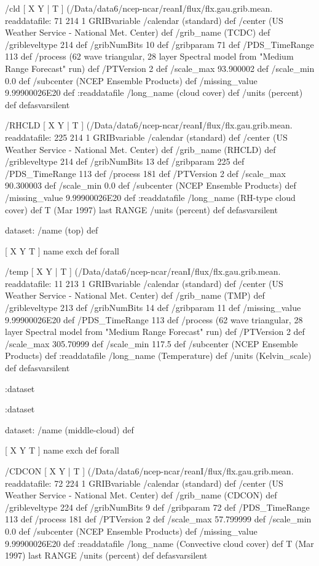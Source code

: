 \begin{ingrid}
  /cld { [ X Y | T ] (/Data/data6/ncep-ncar/reanI/flux/flx.gau.grib.mean.%
  readdatafile:
  71 214 1 GRIBvariable
  /calendar (standard) def
  /center (US Weather Service - National Met. Center) def
  /grib_name (TCDC) def
  /gribleveltype 214 def
  /gribNumBits 10 def
  /gribparam 71 def
  /PDS_TimeRange 113 def
  /process (62 wave triangular, 28 layer Spectral model from "Medium Range Forecast" run) def
  /PTVersion 2 def
  /scale_max 93.900002 def
  /scale_min 0.0 def
  /subcenter (NCEP Ensemble Products) def
  /missing_value 9.99900026E20 def
  :readdatafile
  /long_name (cloud cover) def
  /units (percent) def
  } defasvarsilent

  /RHCLD { [ X Y | T ] (/Data/data6/ncep-ncar/reanI/flux/flx.gau.grib.mean.%
  readdatafile:
  225 214 1 GRIBvariable
  /calendar (standard) def
  /center (US Weather Service - National Met. Center) def
  /grib_name (RHCLD) def
  /gribleveltype 214 def
  /gribNumBits 13 def
  /gribparam 225 def
  /PDS_TimeRange 113 def
  /process 181 def
  /PTVersion 2 def
  /scale_max 90.300003 def
  /scale_min 0.0 def
  /subcenter (NCEP Ensemble Products) def
  /missing_value 9.99900026E20 def
  :readdatafile
  /long_name (RH-type cloud cover) def
  T (Mar 1997) last RANGE
  /units (percent) def
  } defasvarsilent

  dataset: /name (top) def

   [ X Y T ] { name exch def } forall

   /temp { [ X Y | T ] (/Data/data6/ncep-ncar/reanI/flux/flx.gau.grib.mean.%
   readdatafile:
   11 213 1 GRIBvariable
   /calendar (standard) def
   /center (US Weather Service - National Met. Center) def
   /grib_name (TMP) def
   /gribleveltype 213 def
   /gribNumBits 14 def
   /gribparam 11 def
   /missing_value 9.99900026E20 def
   /PDS_TimeRange 113 def
   /process (62 wave triangular, 28 layer Spectral model from "Medium Range Forecast" run) def
   /PTVersion 2 def
   /scale_max 305.70999 def
   /scale_min 117.5 def
   /subcenter (NCEP Ensemble Products) def
   :readdatafile
   /long_name (Temperature) def
   /units (Kelvin_scale) def
   } defasvarsilent

  :dataset

 :dataset

 dataset: /name (middle-cloud) def

  [ X Y T ] { name exch def } forall

  /CDCON { [ X Y | T ] (/Data/data6/ncep-ncar/reanI/flux/flx.gau.grib.mean.%
  readdatafile:
  72 224 1 GRIBvariable
  /calendar (standard) def
  /center (US Weather Service - National Met. Center) def
  /grib_name (CDCON) def
  /gribleveltype 224 def
  /gribNumBits 9 def
  /gribparam 72 def
  /PDS_TimeRange 113 def
  /process 181 def
  /PTVersion 2 def
  /scale_max 57.799999 def
  /scale_min 0.0 def
  /subcenter (NCEP Ensemble Products) def
  /missing_value 9.99900026E20 def
  :readdatafile
  /long_name (Convective cloud cover) def
  T (Mar 1997) last RANGE
  /units (percent) def
  } defasvarsilent


\end{ingrid}
